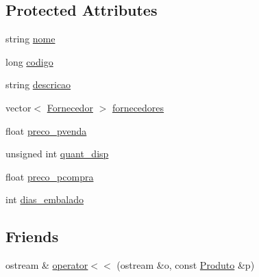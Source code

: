 \subsection*{Protected Attributes}
\begin{DoxyCompactItemize}
\item 
string \hyperlink{class_produto_a68b0af895e00da960bea4fb9d22908a4}{nome}
\item 
long \hyperlink{class_produto_ae550723b388b42aa8d64ae25da28a989}{codigo}
\item 
string \hyperlink{class_produto_a23d49580a8e69e8ad100f1e903951df0}{descricao}
\item 
vector$<$ \hyperlink{class_fornecedor}{Fornecedor} $>$ \hyperlink{class_produto_a9a4cce6876ccbfca25f41851bd48b706}{fornecedores}
\item 
float \hyperlink{class_produto_aafe61b6a241575ca22bfd5ef6880eacc}{preco\_\-pvenda}
\item 
unsigned int \hyperlink{class_produto_a4587e7d30d4fc36691e1d13d5b2ef6a1}{quant\_\-disp}
\item 
float \hyperlink{class_produto_a90ee7ed615f3d9e0b2f0972608c00a87}{preco\_\-pcompra}
\item 
int \hyperlink{class_produto_ad41c279a89d62234c5be52dc66e43de7}{dias\_\-embalado}
\end{DoxyCompactItemize}
\subsection*{Friends}
\begin{DoxyCompactItemize}
\item 
ostream \& \hyperlink{class_produto_a6f7b2fd51a90e6f1db1d7cd35b59e8c5}{operator$<$$<$} (ostream \&o, const \hyperlink{class_produto}{Produto} \&p)
\end{DoxyCompactItemize}


